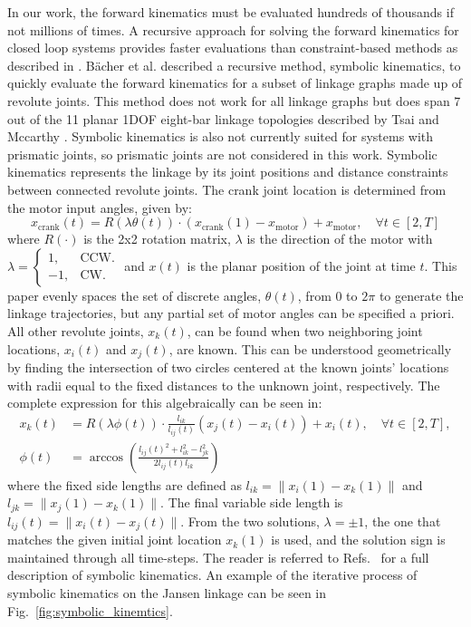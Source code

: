 In our work, the forward kinematics must be evaluated hundreds of thousands if not millions of times. A recursive approach for solving the forward kinematics for closed loop systems provides faster evaluations than constraint-based methods as described in \cite{kecskemethy_symbolic_1997}. Bächer et al. \cite{bacher_linkedit_2015} described a recursive method, symbolic kinematics, to quickly evaluate the forward kinematics for a subset of linkage graphs made up of revolute joints. This method does not work for all linkage graphs but does span 7 out of the 11 planar 1DOF eight-bar linkage topologies described by Tsai and Mccarthy \cite{tsai_mechanism_2000}. Symbolic kinematics is also not currently suited for systems with prismatic joints, so prismatic joints are not considered in this work. Symbolic kinematics represents the linkage by its joint positions and distance constraints between connected revolute joints. The crank joint location is determined from the motor input angles, given by:
\begin{equation}
    x_{\text{crank}}(t) = R(\lambda \theta(t)) \cdot (x_{\text{crank}}(1) - x_{\text{motor}}) + x_{\text{motor}}, \quad \forall t \in [2, T]
\end{equation}
where $R(\cdot)$ is the 2x2 rotation matrix, $\lambda$ is the direction of the motor with $\lambda = \begin{cases}
    1, & \text{CCW}.\\
    -1, & \text{CW}.\end{cases}$ and $x(t)$ is the planar position of the joint at time $t$. This paper evenly spaces the set of discrete angles, $\theta(t)$, from 0 to $2\pi$ to generate the linkage trajectories, but any partial set of motor angles can be specified a priori. All other revolute joints, $x_k(t)$, can be found when two neighboring joint locations, $x_i(t)$ and $x_j(t)$, are known. This can be understood geometrically by finding the intersection of two circles centered at the known joints’ locations with radii equal to the fixed distances to the unknown joint, respectively. The complete expression for this algebraically can be seen in:
\begin{align}
    x_k(t) &= R(\lambda \phi(t)) \cdot \frac{l_{ik}}{l_{ij}(t)} (x_{j}(t) - x_{i}(t)) + x_{i}(t), \quad \forall t \in [2,T], \\
    \phi(t) &= \arccos\left(\frac{l_{ij}(t)^2 + l_{ik}^2 - l_{jk}^2}{2 l_{ij}(t) l_{ik}}\right)
\end{align}
where the fixed side lengths are defined as \( l_{ik} = \| x_i(1) - x_k(1) \| \) and \( l_{jk} = \| x_j(1) - x_k(1) \| \). The final variable side length is \( l_{ij}(t) = \| x_i(t) - x_j(t) \| \). From the two solutions, \( \lambda = \pm 1 \), the one that matches the given initial joint location \( x_k(1) \) is used, and the solution sign is maintained through all time-steps. The reader is referred to Refs.~\cite{pan_joint_2022,bacher_linkedit_2015} for a full description of symbolic kinematics. An example of the iterative process of symbolic kinematics on the Jansen linkage can be seen in Fig.~\ref{fig:symbolic_kinemtics}.


